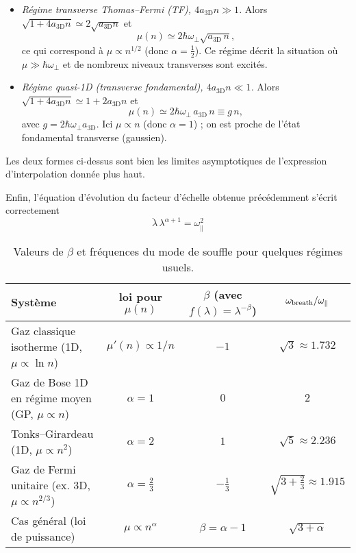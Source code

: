 \begin{itemize}
\item \emph{Régime transverse Thomas--Fermi (TF), \(4a_{\mathrm{3D}}n\gg1\).} 
Alors \(\sqrt{1+4a_{\mathrm{3D}}n}\simeq 2\sqrt{a_{\mathrm{3D}}n}\) et
\[
\mu(n)\simeq 2\hbar\omega_\perp\sqrt{a_{\mathrm{3D}}\,n},
\]
ce qui correspond à \(\mu\propto n^{1/2}\) (donc \(\alpha=\tfrac12\)). Ce régime décrit la situation où \(\mu\gg\hbar\omega_\perp\) et de nombreux niveaux transverses sont excités.
\item \emph{Régime quasi-1D (transverse fondamental), \(4a_{\mathrm{3D}}n\ll1\).} 
Alors \(\sqrt{1+4a_{\mathrm{3D}}n}\simeq 1+2a_{\mathrm{3D}}n\) et
\[
\mu(n)\simeq 2\hbar\omega_\perp\,a_{\mathrm{3D}}\,n \equiv g\,n,
\]
avec \(g=2\hbar\omega_\perp a_{\mathrm{3D}}\). Ici \(\mu\propto n\) (donc \(\alpha=1\)) ; on est proche de l'état fondamental transverse (gaussien).
\end{itemize}

Les deux formes ci-dessus sont bien les limites asymptotiques de l'expression d'interpolation donnée plus haut.

\medskip

Enfin, l'équation d'évolution du facteur d'échelle obtenue précédemment s'écrit correctement
\[
\boxed{\qquad \ddot\lambda\,\lambda^{\alpha+1}=\omega_\parallel^2 \qquad}
\]


\begin{table}[h]
\centering
\begin{tabular}{l c c c}
\hline
Système & loi pour $\mu(n)$ & $\beta$ (avec $f(\lambda)=\lambda^{-\beta}$) & $\displaystyle \omega_{\rm breath}/\omega_\parallel$ \\
\hline
Gaz classique isotherme (1D, $\mu\propto\ln n$) 
& $\mu'(n)\propto 1/n$ 
& $-1$ 
& $\sqrt{3}\approx1.732$ \\[4pt]

Gaz de Bose 1D en régime moyen (GP, $\mu\propto n$) 
& $\alpha=1$ 
& $0$ 
& $2$ \\[4pt]

Tonks--Girardeau (1D, $\mu\propto n^2$) 
& $\alpha=2$ 
& $1$ 
& $\sqrt{5}\approx2.236$ \\[4pt]

Gaz de Fermi unitaire (ex. 3D, $\mu\propto n^{2/3}$) 
& $\alpha=\tfrac{2}{3}$ 
& $-\tfrac{1}{3}$ 
& $\sqrt{3+\tfrac{2}{3}}\approx1.915$ \\[4pt]

Cas général (loi de puissance) 
& $\mu\propto n^\alpha$ 
& $\beta=\alpha-1$ 
& $\displaystyle \sqrt{3+\alpha}$ \\
\hline
\end{tabular}
\caption{Valeurs de $\beta$ et fréquences du mode de souffle pour quelques régimes usuels.}
\label{tab:breathing}
\end{table}
 



